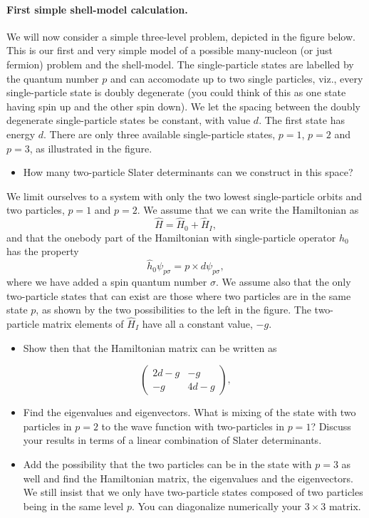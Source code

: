 \documentclass[%
twoside,                 %
final,                   %
10pt]{article}
\begin{document}
\paragraph{First simple shell-model calculation.}
We will now consider a simple three-level problem, depicted in the figure below. This is our first and very simple model of a possible many-nucleon (or just fermion) problem and the shell-model.
The single-particle states are labelled by the quantum number $p$ and can accomodate up to two single particles,  viz., every single-particle state  is doubly degenerate (you could think of this as one state having spin up and the other spin down). 
We let the spacing between the doubly degenerate single-particle states be constant, with value $d$.  The first state
has energy $d$. There are only three available single-particle states, $p=1$, $p=2$ and $p=3$, as illustrated
in the figure. 
\begin{itemize}
\item How many two-particle Slater determinants can we construct in this space? 
\end{itemize}

\noindent
We limit ourselves to a system with only the two lowest single-particle orbits and two particles, $p=1$ and $p=2$. We assume that we can write the Hamiltonian as
\[
       \hat{H}=\hat{H}_0+\hat{H}_I,
\]
and that the onebody part of the Hamiltonian with single-particle operator $\hat{h}_0$ has the property
\[
\hat{h}_0\psi_{p\sigma} = p\times d \psi_{p\sigma},
\]
where we have added a spin quantum number $\sigma$. 
We assume also that the only two-particle states that can exist are those where two particles are in the 
same state $p$, as shown by the two possibilities to the left in the figure.
The two-particle matrix elements of $\hat{H}_I$ have all a constant value, $-g$.



\begin{itemize}
\item Show then that the Hamiltonian matrix can be written as 
\end{itemize}

\noindent
\[
\left(\begin{array}{cc}2d-g &-g \\
-g &4d-g \end{array}\right),
\]
\begin{itemize}
\item Find the eigenvalues and eigenvectors.  What is mixing of the state with two particles in $p=2$  to the wave function with two-particles in $p=1$? Discuss your results in terms of a linear combination of Slater determinants. 

\item Add the possibility that the two particles can be in the state with $p=3$ as well and find the Hamiltonian matrix, the eigenvalues and the eigenvectors. We still insist that we only have two-particle states composed of two particles being in the same level $p$. You can diagonalize numerically your $3\times 3$ matrix.
\end{itemize}
\end{document}

